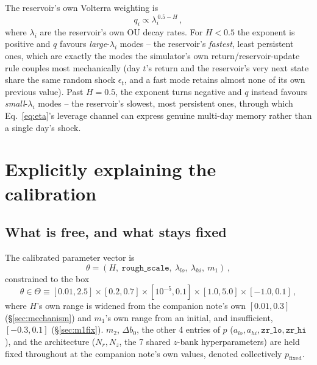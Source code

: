 \documentclass[11pt]{article}
\begin{document}
The reservoir's own Volterra weighting is
\begin{equation}
q_i \propto \lambda_i^{\,0.5-H}\, ,
\label{eq:qform}
\end{equation}
where $\lambda_i$ are the reservoir's own OU decay rates. For $H<0.5$ the
exponent is positive and $q$ favours \emph{large}-$\lambda_i$ modes -- the
reservoir's \emph{fastest}, least persistent ones, which are exactly the
modes the simulator's own return/reservoir-update rule couples most
mechanically (day $t$'s return and the reservoir's very next state share the
same random shock $\epsilon_t$, and a fast mode retains almost none of its
own previous value). Past $H=0.5$, the exponent turns negative and $q$
instead favours \emph{small}-$\lambda_i$ modes -- the reservoir's slowest,
most persistent ones, through which Eq.~\ref{eq:eta}'s leverage channel can
express genuine multi-day memory rather than a single day's shock.

\section{Explicitly explaining the calibration}
\label{sec:calibmethod}

\subsection{What is free, and what stays fixed}
The calibrated parameter vector is
\begin{equation}
\theta = (H,\ \texttt{rough\_scale},\ \lambda_{lo},\ \lambda_{hi},\ m_1)\, ,
\label{eq:theta}
\end{equation}
constrained to the box
\begin{equation}
\theta \in \Theta \equiv [0.01,2.5]\times[0.2,0.7]\times[10^{-5},0.1]
\times[1.0,5.0]\times[-1.0,0.1]\, ,
\label{eq:bounds}
\end{equation}
where $H$'s own range is widened from the companion note's own $[0.01,0.3]$
(\S\ref{sec:mechanism}) and $m_1$'s own range from an initial, and
insufficient, $[-0.3,0.1]$ (\S\ref{sec:m1fix}). $m_2$, $\Delta b_0$, the
other 4 entries of $p$ ($a_{lo},a_{hi},\texttt{zr\_lo},\texttt{zr\_hi}$), and
the architecture ($N_r,N_z$, the 7 shared $z$-bank hyperparameters) are held
fixed throughout at the companion note's own values, denoted collectively
$p_{\text{fixed}}$.
\end{document}
